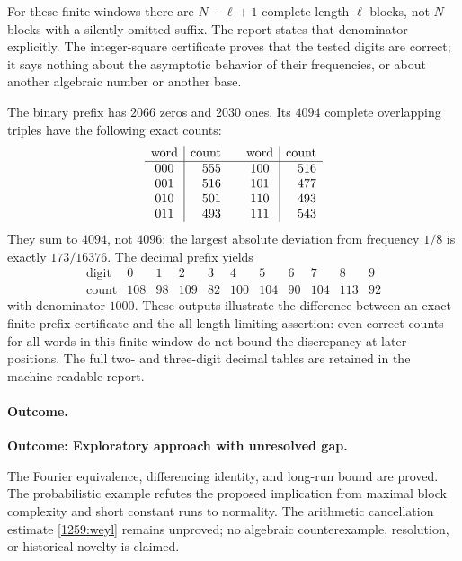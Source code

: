 \documentclass[11pt,a4paper]{article}
\numberwithin{equation}{section}
\begin{document}
For these finite windows there are $N-\ell+1$ complete length-$\ell$
blocks, not $N$ blocks with a silently omitted suffix.  The report
states that denominator explicitly.  The integer-square certificate
proves that the tested digits are correct; it says nothing about the
asymptotic behavior of their frequencies, or about another algebraic
number or another base.

The binary prefix has $2066$ zeros and $2030$ ones. Its $4094$
complete overlapping triples have the following exact counts:
\[
\begin{array}{c|r@{\qquad}c|r}
\text{word}&\text{count}&\text{word}&\text{count}\\\hline
000&555&100&516\\
001&516&101&477\\
010&501&110&493\\
011&493&111&543
\end{array}
\]
They sum to $4094$, not $4096$; the largest absolute deviation from
frequency $1/8$ is exactly $173/16376$. The decimal prefix yields
\[
\begin{array}{c|rrrrrrrrrr}
\text{digit}&0&1&2&3&4&5&6&7&8&9\\\hline
\text{count}&108&98&109&82&100&104&90&104&113&92
\end{array}
\]
with denominator $1000$. These outputs illustrate the difference
between an exact finite-prefix certificate and the all-length limiting
assertion: even correct counts for all words in this finite window do
not bound the discrepancy at later positions. The full two- and
three-digit decimal tables are retained in the machine-readable report.

\paragraph{Outcome.}
\textbf{Outcome: Exploratory approach with unresolved gap.}

The Fourier equivalence, differencing identity, and long-run bound are
proved.  The probabilistic example refutes the proposed implication
from maximal block complexity and short constant runs to normality.
The arithmetic cancellation estimate \eqref{1259:weyl} remains unproved;
no algebraic counterexample, resolution, or historical novelty is claimed.
\end{document}
